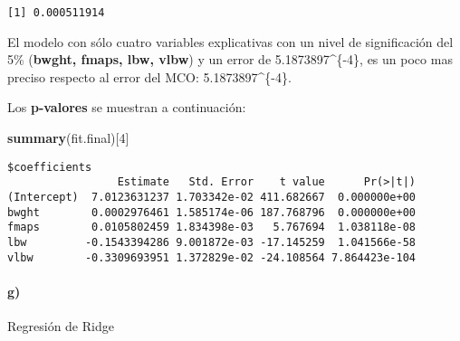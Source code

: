 \documentclass[]{article}
\newenvironment{Shaded}{\begin{snugshade}}{\end{snugshade}}
\newcommand{\KeywordTok}[1]{\textcolor[rgb]{0.13,0.29,0.53}{\textbf{#1}}}
\newcommand{\DataTypeTok}[1]{\textcolor[rgb]{0.13,0.29,0.53}{#1}}
\newcommand{\DecValTok}[1]{\textcolor[rgb]{0.00,0.00,0.81}{#1}}
\newcommand{\OperatorTok}[1]{\textcolor[rgb]{0.81,0.36,0.00}{\textbf{#1}}}
\newcommand{\NormalTok}[1]{#1}
\let\oldparagraph\paragraph
\renewcommand{\paragraph}[1]{\oldparagraph{#1}\mbox{}}
\begin{document}
\begin{verbatim}
[1] 0.000511914
\end{verbatim}

El modelo con sólo cuatro variables explicativas con un nivel de
significación del 5\% (\textbf{bwght, fmaps, lbw, vlbw}) y un error de
5.1873897\^{}\{-4\}, es un poco mas preciso respecto al error
del MCO: 5.1873897\^{}\{-4\}.

Los \textbf{p-valores} se muestran a continuación:

\begin{Shaded}
\begin{Highlighting}[]
\KeywordTok{summary}\NormalTok{(fit.final)[}\DecValTok{4}\NormalTok{]}
\end{Highlighting}
\end{Shaded}

\begin{verbatim}
$coefficients
                 Estimate   Std. Error    t value      Pr(>|t|)
(Intercept)  7.0123631237 1.703342e-02 411.682667  0.000000e+00
bwght        0.0002976461 1.585174e-06 187.768796  0.000000e+00
fmaps        0.0105802459 1.834398e-03   5.767694  1.038118e-08
lbw         -0.1543394286 9.001872e-03 -17.145259  1.041566e-58
vlbw        -0.3309693951 1.372829e-02 -24.108564 7.864423e-104
\end{verbatim}

\paragraph{g)}\label{g}

Regresión de Ridge

\begin{Shaded}
\end{Shaded}
\end{document}
